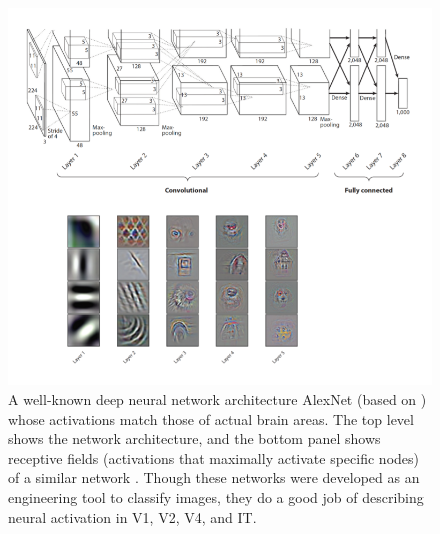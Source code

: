 \begin{figure}[h]
\centering
\includegraphics[scale=.4]{./images/deepLearningBrain.png}
\caption[From \cite{kriegeskorte2015deep}, which is in turn based on \cite{krizhevsky2012imagenet} and \cite{gucclu2015deep}.]{A well-known deep neural network architecture AlexNet (based on \cite{krizhevsky2012imagenet}) whose activations match those of actual brain areas. The top level shows the network architecture, and the bottom panel shows receptive fields (activations that maximally activate specific nodes) of a similar network \cite{gucclu2015deep}. Though these networks were developed as an engineering tool to classify images, they do a good job of describing neural activation in V1, V2, V4, and IT.}
\label{deepLearning_Vision}
\end{figure}

